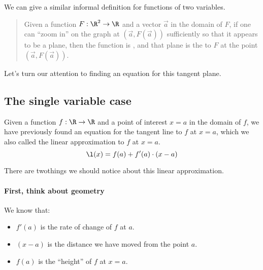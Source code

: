 \documentclass{ximera}
\begin{document}
We can give a similar informal definition for functions of two
variables.
\begin{quote}
  Given a function $F:\R^2\to\R$ and a vector $\vec{a}$ in the domain
  of $F$, if one can ``zoom in'' on the graph at $(\vec{a},
  F(\vec{a}))$ sufficiently so that it appears to be a plane, then the
  function is , and that plane is the  to $F$ at the point $(\vec{a},F(\vec{a}))$.
\end{quote}

Let's turn our attention to finding an equation for this tangent
plane.


\subsection{The single variable case}

Given a function $f : \R \to \R$ and a point of interest $x=a$ in the
domain of $f$, we have previously found an equation for the tangent
line to $f$ at $x=a$, which we also called the linear approximation to
$f$ at $x=a$.
\[
\l(x) = f(a) + f'(a) \cdot (x-a)
\]

There are twothings we should notice about this linear approximation.

\paragraph{First, think about geometry}  We know that:
\begin{itemize}
\item $f'(a)$ is the rate of change of $f$ at $a$.
\item $(x-a)$ is the distance we have moved from the point $a$.
\item $f(a)$ is the ``height'' of $f$ at $x=a$.
\end{itemize}
\end{document}
